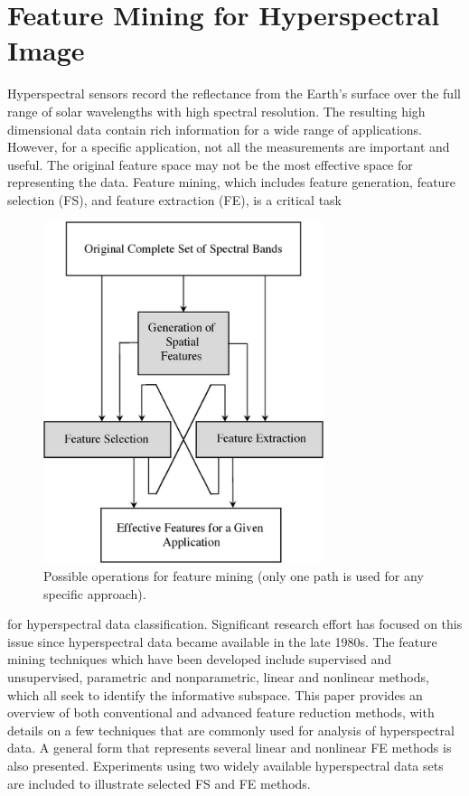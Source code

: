 \documentclass[document.tex]{subfiles}
\begin{document}
\section{Feature Mining for Hyperspectral Image}
\noindent Hyperspectral sensors record the reflectance from the Earth’s surface over the full range
of solar wavelengths with high spectral resolution. The resulting high dimensional data
contain rich information for a wide range of applications. However, for a specific application, not all the measurements are important and useful. The original feature space may
not be the most effective space for representing the data. Feature mining, which includes
feature generation, feature selection (FS), and feature extraction (FE), is a critical task
\begin{figure}[H]
	\begin{center}
		\includegraphics[height=10.0cm]{imgs/OperationFeatureMining.jpg}
	\end{center}
	\caption{Possible operations for feature mining (only one path is used for any specific
		approach).}
	\label{fig:Possible operations for feature mining (only one path is used for any specific
		approach).}
\end{figure}
for hyperspectral data classification. Significant research effort has focused on this issue since hyperspectral data became available in the late 1980s. The feature mining techniques which have been developed include supervised and unsupervised, parametric and
nonparametric, linear and nonlinear methods, which all seek to identify the informative
subspace. This paper provides an overview of both conventional and advanced feature
reduction methods, with details on a few techniques that are commonly used for analysis
of hyperspectral data. A general form that represents several linear and nonlinear FE
methods is also presented. Experiments using two widely available hyperspectral data
sets are included to illustrate selected FS and FE methods.
\end{document}
